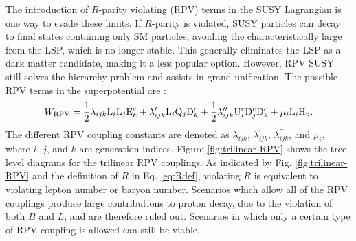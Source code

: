The introduction of $R$-parity violating (RPV) terms in the SUSY Lagrangian is one way to evade these limits. If $R$-parity is violated, SUSY particles can decay to final states containing only SM particles, avoiding the characteristically large \met from the LSP, which is no longer stable. This generally eliminates the LSP as a dark matter candidate, making it a less popular option. However, RPV SUSY still solves the hierarchy problem and assists in grand unification. The possible RPV terms in the superpotential are \cite{Barbier}:
\begin{equation}
W_{\text{RPV}} = \frac{1}{2}\lambda_{ijk}\mathrm{L}_{i}\mathrm{L}_{j}\mathrm{E}_{k}^{c} + \lambda_{ijk}^{\prime}\mathrm{L}_{i}\mathrm{Q}_{j}\mathrm{D}_{k}^{c} + \frac{1}{2}\lambda_{ijk}^{\prime \prime}\mathrm{U}_{i}^{c}\mathrm{D}_{j}^{c}\mathrm{D}_{k}^{c} + \mu_{i}\mathrm{L}_{i}\mathrm{H}_\mathrm{u}. \label{eq:WRPV}
\end{equation}
The different RPV coupling constants are denoted as $\lambda_{ijk}$, $\lambda^{\prime}_{ijk}$, $\lambda^{\prime \prime}_{ijk}$, and $\mu_{i}$, where $i$, $j$, and $k$ are generation indices. Figure \ref{fig:trilinear-RPV} shows the tree-level diagrams for the trilinear RPV couplings. As indicated by Fig. \ref{fig:trilinear-RPV} and the definition of $R$ in Eq. \eqref{eq:Rdef}, violating $R$ is equivalent to violating lepton number or baryon number. Scenarios which allow all of the RPV couplings produce large contributions to proton decay, due to the violation of both $B$ and $L$, and are therefore ruled out. Scenarios in which only a certain type of RPV coupling is allowed can still be viable.

